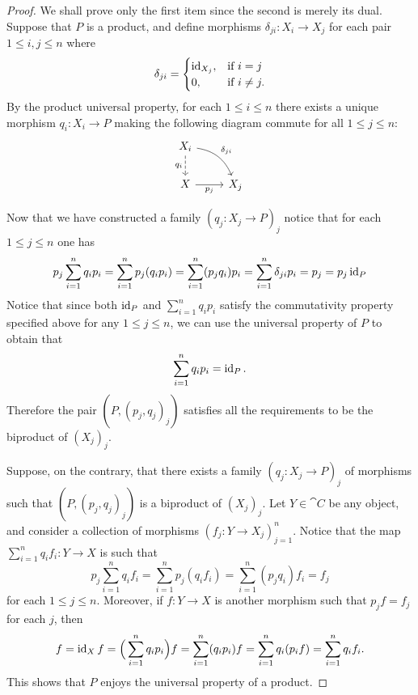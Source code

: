 \begin{proof}
    We shall prove only the first item since the second is merely its dual. Suppose
    that \(P\) is a product, and define morphisms \(\delta_{j i}: X_i \to X_j\) for each
    pair \(1 \leq i, j \leq n\) where
    \[
        \delta_{j i} =
        \begin{cases}
            \operatorname{id}_{X_j}, & \text{if } i = j     \\
            0,         & \text{if } i \neq j. \\
        \end{cases}
    \]
    By the product universal property, for each \(1 \leq i \leq n\)
    there exists a unique morphism \(q_i: X_i \to P\) making the following diagram
    commute for all \(1 \leq j \leq n\):
    \[
        \begin{tikzcd}
            X_i
            \ar[d, dashed, "q_i"']
            \ar[rd, bend left, "\delta_{j i}"]
            & \\
            X \ar[r, "p_j"']
            &X_j
        \end{tikzcd}
    \]

    Now that we have constructed a family \((q_j: X_j \to P)_j\) notice that for each
    \(1 \leq j \leq n\) one has
    \[
        p_j \sum_{i=1}^n q_i p_i
        = \sum_{i=1}^n p_j (q_i p_i)
        = \sum_{i=1}^{n} (p_j q_i) p_i
        = \sum_{i=1}^{n} \delta_{j i} p_i
        = p_j
        = p_j \operatorname{id}_P
    \]
    Notice that since both \(\operatorname{id}_P\) and \(\sum_{i=1}^{n} q_i p_i\) satisfy the
    commutativity property specified above for any \(1 \leq j \leq n\), we can use the
    universal property of \(P\) to obtain that
    \[
        \sum_{i=1}^{n} q_i p_i = \operatorname{id}_P.
    \]
    Therefore the pair \((P, (p_j, q_j)_j)\) satisfies all the requirements to be
    the biproduct of \((X_j)_j\).

    Suppose, on the contrary, that there exists a family \((q_j: X_j \to P)_j\) of
    morphisms such that \((P, (p_j, q_j)_j)\) is a biproduct of \((X_j)_j\). Let
    \(Y \in \cat C\) be any object, and consider a collection of morphisms
    \((f_j: Y \to X_j)_{j=1}^n\). Notice that the map \(\sum_{i=1}^{n} q_i f_i: Y \to X\)
    is such that
    \[
        p_j \sum_{i=1}^n q_i f_i
        = \sum_{i=1}^{n} p_j (q_i f_i)
        = \sum_{i=1}^{n} (p_j q_i) f_i
        = f_j
    \]
    for each \(1 \leq j \leq n\). Moreover, if \(f: Y \to X\) is another morphism such that
    \(p_j f = f_j\) for each \(j\), then
    \[
        f
        = \operatorname{id}_X f
        = \Big( \sum_{i=1}^n q_i p_i \Big) f
        = \sum_{i=1}^{n} (q_i p_i) f
        = \sum_{i=1}^{n} q_i (p_i f)
        = \sum_{i=1}^{n} q_i f_i.
    \]
    This shows that \(P\) enjoys the universal property of a product.
\end{proof}

